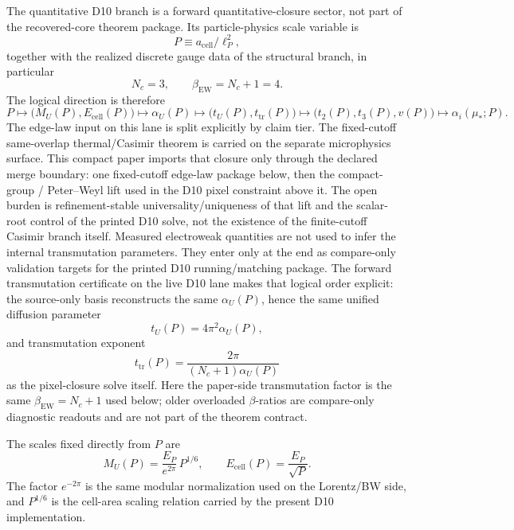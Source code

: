 \documentclass[11pt]{article}
\begin{document}
The quantitative D10 branch is a forward quantitative-closure sector, not part of the recovered-core theorem package. Its particle-physics scale variable is
\[
P \equiv a_{\mathrm{cell}}/\ell_P^2,
\]
together with the realized discrete gauge data of the structural branch, in particular
\[
N_c=3,
\qquad
\beta_{\mathrm{EW}}=N_c+1=4.
\]
The logical direction is therefore
\[
P
\longmapsto
\bigl(M_U(P),E_{\mathrm{cell}}(P)\bigr)
\longmapsto
\alpha_U(P)
\longmapsto
\bigl(t_U(P),t_{\mathrm{tr}}(P)\bigr)
\longmapsto
\bigl(t_2(P),t_3(P),v(P)\bigr)
\longmapsto
\alpha_i(\mu_\ast;P).
\]
The edge-law input on this lane is split explicitly by claim tier. The fixed-cutoff
same-overlap thermal/Casimir theorem is carried on the separate microphysics surface. This
compact paper imports that closure only through the declared merge boundary: one fixed-cutoff
edge-law package below, then the compact-group / Peter--Weyl lift used in the D10 pixel
constraint above it. The open burden is refinement-stable universality/uniqueness of
that lift and the scalar-root control of the printed D10 solve, not the existence of the
finite-cutoff Casimir branch itself.
Measured electroweak quantities are not used to infer the internal transmutation parameters. They enter only at the end as compare-only validation targets for the printed D10 running/matching package.
The forward transmutation certificate on the live D10 lane makes that logical order explicit: the source-only basis reconstructs the same \(\alpha_U(P)\), hence the same unified diffusion parameter
\[
t_U(P)=4\pi^2\alpha_U(P),
\]
and transmutation exponent
\[
t_{\mathrm{tr}}(P)=\frac{2\pi}{(N_c+1)\alpha_U(P)}
\]
as the pixel-closure solve itself. Here the paper-side transmutation factor is the same
\(\beta_{\mathrm{EW}}=N_c+1\) used below; older overloaded \(\beta\)-ratios are compare-only
diagnostic readouts and are not part of the theorem contract.

The scales fixed directly from \(P\) are
\[
M_U(P)=\frac{E_P}{e^{2\pi}}\,P^{1/6},
\qquad
E_{\mathrm{cell}}(P)=\frac{E_P}{\sqrt P}.
\]
The factor \(e^{-2\pi}\) is the same modular normalization used on the Lorentz/BW side, and \(P^{1/6}\) is the cell-area scaling relation carried by the present D10 implementation.
\end{document}
